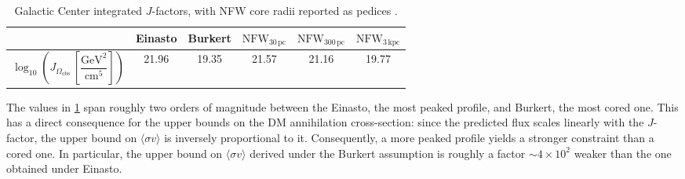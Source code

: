 \begin{table}[H]
\centering
\begin{tabular}{c|c|c|c|c|c}
\hline
 & Einasto & Burkert & $\mathrm{NFW}_{30\,\mathrm{pc}}$ & $\mathrm{NFW}_{300\,\mathrm{pc}}$ & $\mathrm{NFW}_{3\,\mathrm{kpc}}$ \\
\hline
$\log_{10}\!\left(J_{\Omega_{\mathrm{obs}}}\,\left[\dfrac{\mathrm{GeV}^2}{\mathrm{cm}^5}\right]\right)$
& 21.96 & 19.35 & 21.57 & 21.16 & 19.77 \\
\hline
\end{tabular}
\caption{Galactic Center integrated $J$-factors, with NFW core radii reported as pedices \cite{Lefranc_2016}.}
\label{tab:gc_jfactors}
\end{table}

The values in \cref{tab:gc_jfactors} span roughly two orders of magnitude 
between the Einasto, the most peaked profile, and Burkert, the most cored one.
This has a direct consequence for 
the upper bounds on the DM annihilation cross-section: since the predicted flux scales linearly with the 
$J$-factor, the upper bound on $\langle \sigma v \rangle$ is inversely 
proportional to it. Consequently, a more peaked profile yields a stronger constraint than a cored one.
In particular, the upper bound on $\langle \sigma v \rangle$ derived under the Burkert assumption 
is roughly a factor $\sim 4 \times 10^2$ weaker than the one obtained under Einasto.



